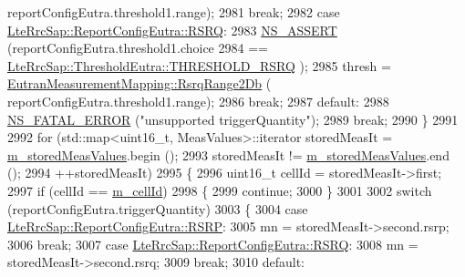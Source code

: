 \begin{DoxyCode}
      reportConfigEutra.threshold1.range);
2981             \textcolor{keywordflow}{break};
2982           \textcolor{keywordflow}{case} \hyperlink{structns3_1_1LteRrcSap_1_1ReportConfigEutra_a82343ddf526faba0483431ea5882a3efaa4e09cb3c7154d7ab732115a2647325f}{LteRrcSap::ReportConfigEutra::RSRQ}:
2983             \hyperlink{assert_8h_a6dccdb0de9b252f60088ce281c49d052}{NS\_ASSERT} (reportConfigEutra.threshold1.choice
2984                        == \hyperlink{structns3_1_1LteRrcSap_1_1ThresholdEutra_ad3ed2704b836132980dd2e97cb03822ca6e8bda2b99825f09f53388c29b6402b4}{LteRrcSap::ThresholdEutra::THRESHOLD\_RSRQ}
      );
2985             thresh = \hyperlink{classns3_1_1EutranMeasurementMapping_a8c1e02fbc1226718eb0914cf13362147}{EutranMeasurementMapping::RsrqRange2Db} (
      reportConfigEutra.threshold1.range);
2986             \textcolor{keywordflow}{break};
2987           \textcolor{keywordflow}{default}:
2988             \hyperlink{group__fatal_ga5131d5e3f75d7d4cbfd706ac456fdc85}{NS\_FATAL\_ERROR} (\textcolor{stringliteral}{"unsupported triggerQuantity"});
2989             \textcolor{keywordflow}{break};
2990           \}
2991 
2992         \textcolor{keywordflow}{for} (std::map<uint16\_t, MeasValues>::iterator storedMeasIt = 
      \hyperlink{classns3_1_1LteUeRrc_a93094dcd5c235b2e2a8a299125100a57}{m\_storedMeasValues}.begin ();
2993              storedMeasIt != \hyperlink{classns3_1_1LteUeRrc_a93094dcd5c235b2e2a8a299125100a57}{m\_storedMeasValues}.end ();
2994              ++storedMeasIt)
2995           \{
2996             uint16\_t cellId = storedMeasIt->first;
2997             \textcolor{keywordflow}{if} (cellId == \hyperlink{classns3_1_1LteUeRrc_aa9d3317734eea9158371d9fccf3a0c48}{m\_cellId})
2998               \{
2999                 \textcolor{keywordflow}{continue};
3000               \}
3001 
3002             \textcolor{keywordflow}{switch} (reportConfigEutra.triggerQuantity)
3003               \{
3004               \textcolor{keywordflow}{case} \hyperlink{structns3_1_1LteRrcSap_1_1ReportConfigEutra_a82343ddf526faba0483431ea5882a3efa5b7591e86ab7bcefc7fe1528762114d7}{LteRrcSap::ReportConfigEutra::RSRP}:
3005                 mn = storedMeasIt->second.rsrp;
3006                 \textcolor{keywordflow}{break};
3007               \textcolor{keywordflow}{case} \hyperlink{structns3_1_1LteRrcSap_1_1ReportConfigEutra_a82343ddf526faba0483431ea5882a3efaa4e09cb3c7154d7ab732115a2647325f}{LteRrcSap::ReportConfigEutra::RSRQ}:
3008                 mn = storedMeasIt->second.rsrq;
3009                 \textcolor{keywordflow}{break};
3010               \textcolor{keywordflow}{default}:

\end{DoxyCode}
